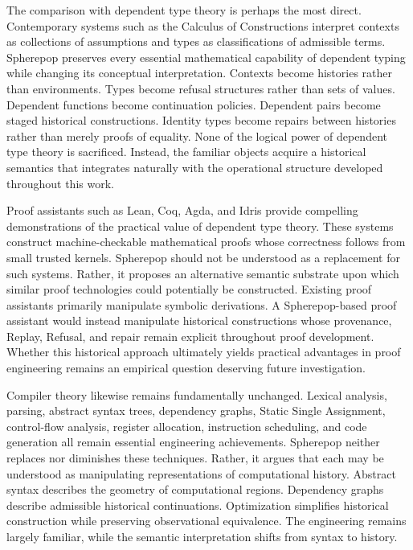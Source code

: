 \documentclass[12pt,oneside]{article}
\theoremstyle{definition}
\theoremstyle{remark}
\begin{document}
The comparison with dependent type theory is perhaps the most direct.
Contemporary systems such as the Calculus of Constructions interpret contexts
as collections of assumptions and types as classifications of admissible
terms. Spherepop preserves every essential mathematical capability of
dependent typing while changing its conceptual interpretation. Contexts become
histories rather than environments. Types become refusal structures rather
than sets of values. Dependent functions become continuation policies.
Dependent pairs become staged historical constructions. Identity types become
repairs between histories rather than merely proofs of equality. None of the
logical power of dependent type theory is sacrificed. Instead, the familiar
objects acquire a historical semantics that integrates naturally with the
operational structure developed throughout this work.

Proof assistants such as Lean, Coq, Agda, and Idris provide compelling
demonstrations of the practical value of dependent type theory. These systems
construct machine-checkable mathematical proofs whose correctness follows from
small trusted kernels. Spherepop should not be understood as a replacement for
such systems. Rather, it proposes an alternative semantic substrate upon which
similar proof technologies could potentially be constructed. Existing proof
assistants primarily manipulate symbolic derivations. A Spherepop-based proof
assistant would instead manipulate historical constructions whose provenance,
Replay, Refusal, and repair remain explicit throughout proof development.
Whether this historical approach ultimately yields practical advantages in
proof engineering remains an empirical question deserving future
investigation.

Compiler theory likewise remains fundamentally unchanged. Lexical analysis,
parsing, abstract syntax trees, dependency graphs, Static Single Assignment,
control-flow analysis, register allocation, instruction scheduling, and code
generation all remain essential engineering achievements. Spherepop neither
replaces nor diminishes these techniques. Rather, it argues that each may be
understood as manipulating representations of computational history. Abstract
syntax describes the geometry of computational regions. Dependency graphs
describe admissible historical continuations. Optimization simplifies
historical construction while preserving observational equivalence. The
engineering remains largely familiar, while the semantic interpretation shifts
from syntax to history.
\end{document}
